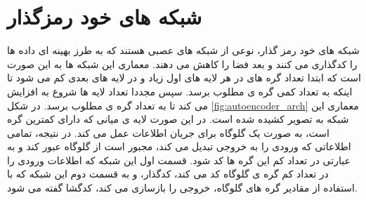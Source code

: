 \section{شبکه های خود رمزگذار}

شبکه های خود رمز گذار، نوعی از شبکه های عصبی هستند که به طرز بهینه ای داده ها را کدگذاری می کنند و بعد فضا را کاهش می دهند.
معماری این شبکه ها به این صورت است که ابتدا تعداد گره های در هر لایه های اول زیاد و در لایه های بعدی کم می شود تا اینکه به تعداد کمی گره ی مطلوب برسد. سپس مجددا تعداد لایه ها شروع به افزایش می کند تا به تعداد گره ی مطلوب برسد. در شکل
\ref{fig:autoencoder_arch}
معماری این شبکه به تصویر کشیده شده است.
در این صورت لایه ی میانی که دارای کمترین گره است، به صورت یک گلوگاه برای جریان اطلاعات عمل می کند. در نتیجه،‌ تمامی اطلاعاتی که ورودی را به خروجی تبدیل می کند،‌ مجبور است از گلوگاه عبور کند و به عبارتی در تعداد کم این گره ها کد شود. قسمت اول این شبکه که اطلاعات ورودی را در تعداد کم گره ی گلوگاه کد می کند، کدگذار، و به قسمت دوم این شبکه که با استفاده از مقادیر گره های گلوگاه، خروجی را بازسازی می کند،‌ کدگشا گفته می شود.
